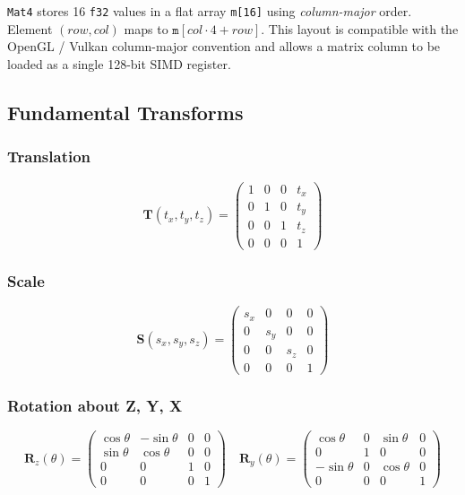 \texttt{Mat4} stores 16 \texttt{f32} values in a flat array \texttt{m[16]}
using \emph{column-major} order. Element $(row, col)$ maps to
$\texttt{m}[col \cdot 4 + row]$. This layout is compatible with the
OpenGL / Vulkan column-major convention and allows a matrix column to
be loaded as a single 128-bit SIMD register.

\subsection{Fundamental Transforms}

\subsubsection{Translation}

\[
\mathbf{T}(t_x, t_y, t_z) =
\begin{pmatrix}
1 & 0 & 0 & t_x \\
0 & 1 & 0 & t_y \\
0 & 0 & 1 & t_z \\
0 & 0 & 0 & 1
\end{pmatrix}
\]

\subsubsection{Scale}

\[
\mathbf{S}(s_x, s_y, s_z) =
\begin{pmatrix}
s_x & 0   & 0   & 0 \\
0   & s_y & 0   & 0 \\
0   & 0   & s_z & 0 \\
0   & 0   & 0   & 1
\end{pmatrix}
\]

\subsubsection{Rotation about Z, Y, X}

\[
\mathbf{R}_z(\theta) =
\begin{pmatrix}
\cos\theta & -\sin\theta & 0 & 0 \\
\sin\theta &  \cos\theta & 0 & 0 \\
0          & 0           & 1 & 0 \\
0          & 0           & 0 & 1
\end{pmatrix}
\quad
\mathbf{R}_y(\theta) =
\begin{pmatrix}
 \cos\theta & 0 & \sin\theta & 0 \\
 0          & 1 & 0          & 0 \\
-\sin\theta & 0 & \cos\theta & 0 \\
 0          & 0 & 0          & 1
\end{pmatrix}
\]

